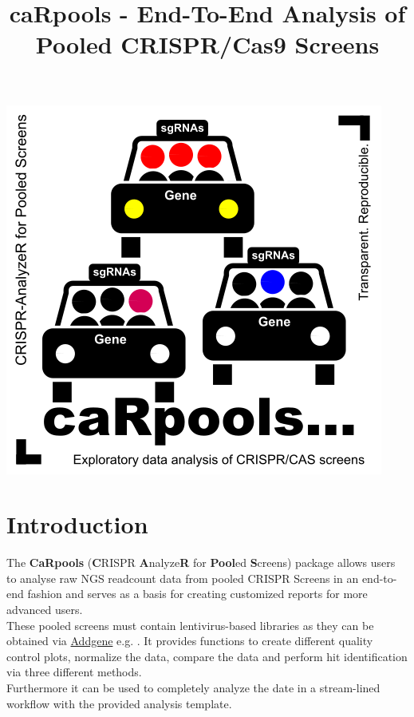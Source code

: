 \documentclass[]{article}
\title{caRpools - End-To-End Analysis of Pooled CRISPR/Cas9 Screens}
\author{}
\date{}
\begin{document}
\maketitle

{
\hypersetup{linkcolor=black}
\setcounter{tocdepth}{4}
\tableofcontents
}
\newpage

\begin{center}
\includegraphics{./pictures/CaRpools.png}
\end{center}

\newpage

\section{Introduction}\label{introduction}

The \textbf{CaRpools} (\textbf{C}RISPR \textbf{A}nalyze\textbf{R} for
\textbf{Pool}ed \textbf{S}creens) package allows users to analyse raw
NGS readcount data from pooled CRISPR Screens in an end-to-end fashion
and serves as a basis for creating customized reports for more advanced
users.\\
These pooled screens must contain lentivirus-based libraries as they can
be obtained via
\href{https://www.addgene.org/CRISPR/libraries/}{Addgene} e.g. . It
provides functions to create different quality control plots, normalize
the data, compare the data and perform hit identification via three
different methods.\\
Furthermore it can be used to completely analyze the date in a
stream-lined workflow with the provided analysis template.
\end{document}
